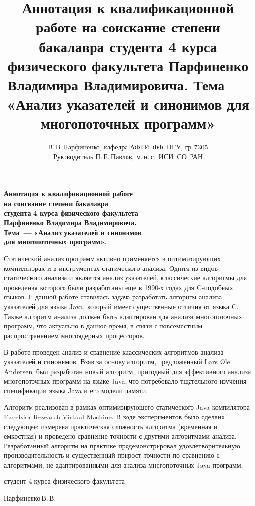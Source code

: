 \documentclass[12pt]{article}
\title{
  Аннотация к квалификационной работе на соискание степени бакалавра студента 4
  курса физического факультета Парфиненко Владимира Владимировича.
  Тема~--- «Анализ указателей и синонимов для многопоточных программ»
}
\author{
  В.\,В.\,Парфиненко, кафедра АФТИ~ФФ~НГУ, гр.\,7305\\
  Руководитель П.\,Е.\,Павлов, м.\,н.\,с.~ИСИ~СО~РАН
}
\newcommand{\eng}[1]{{\English#1}}
\begin{document}
  \thispagestyle{empty}

  \begin{center}
    \bfseries
    Аннотация к квалификационной работе\\
    на соискание степени бакалавра\\
    студента 4 курса физического факультета\\
    Парфиненко Владимира Владимировича.\\
    Тема~--- «Анализ указателей и синонимов\\
    для многопоточных программ».
  \end{center}
  \vspace{0.5cm}

  Статический анализ программ активно применяется в оптимизирующих компиляторах
  и в инструментах статического анализа. Одним из видов статического анализа и
  является анализ указателей, классические алгоритмы для проведения которого
  были разработаны еще в 1990-х годах для \eng{C}-подобных языков. В данной
  работе ставилась задача разработать алгоритм анализа указателей для
  языка \eng{Java}, который имеет существенные отличия от языка \eng{C}.
  Также алгоритм анализа должен быть адаптирован для анализа многопоточных
  программ, что актуально в данное время, в связи с повсеместным
  распространением многоядерных процессоров.

  В работе проведен анализ и сравнение классических алгоритмов анализа
  указателей и синонимов. Взяв за основу алгоритм, предложенный \eng{Lars Ole
  Andersen}, был разработан новый алгоритм, пригодный для эффективного анализа
  многопоточных программ на языке \eng{Java}, что потребовало тщательного
  изучения спецификации языка \eng{Java} и его модели памяти.

  Алгоритм реализован в рамках оптимизирующего статического \eng{Java}
  компилятора \eng{Excelsior Research Virtual Machine}. В ходе экспериментов
  было сделано следующее: измерена практическая сложность алгоритма
  (временная и емкостная) и проведено сравнение точности с другими алгоритмами
  анализа. Разработанный алгоритм на практике продемонстрировал
  удовлетворительную производительность и существенный прирост точности по
  сравнению с алгоритмами, не адаптированными для анализа многопоточных
  \eng{Java}-программ.

  \vspace{0.5cm}

  \begin{flushright}

    студент 4 курса физического факультета

    Парфиненко\,В.\,В.

  \end{flushright}
\end{document}
